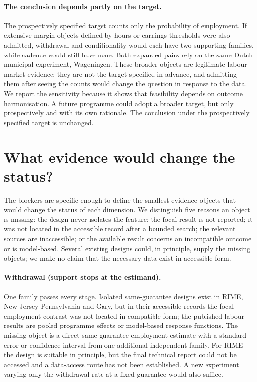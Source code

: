 \documentclass[11pt]{article}
\begin{document}
\paragraph{The conclusion depends partly on the target.} The prospectively specified target counts only the probability of employment. If extensive-margin objects defined by hours or earnings thresholds were also admitted, withdrawal and conditionality would each have two supporting families, while cadence would still have none. %
Both expanded pairs rely on the same Dutch municipal experiment, Wageningen. These broader objects are legitimate labour-market evidence; they are not the target specified in advance, and admitting them after seeing the counts would change the question in response to the data. We report the sensitivity because it shows that feasibility depends on outcome harmonisation. A future programme could adopt a broader target, but only prospectively and with its own rationale. The conclusion under the prospectively specified target is unchanged.

\section{What evidence would change the status?}

The blockers are specific enough to define the smallest evidence objects that would change the status of each dimension. We distinguish five reasons an object is missing: the design never isolates the feature; the focal result is not reported; it was not located in the accessible record after a bounded search; the relevant sources are inaccessible; or the available result concerns an incompatible outcome or is model-based. Several existing designs could, in principle, supply the missing objects; we make no claim that the necessary data exist in accessible form.

\paragraph{Withdrawal (support stops at the estimand).} One family passes every stage. Isolated same-guarantee designs exist in RIME, New Jersey-Pennsylvania and Gary, but in their accessible records the focal employment contrast was not located in compatible form; the published labour results are pooled programme effects or model-based response functions. The missing object is a direct same-guarantee employment estimate with a standard error or confidence interval from one additional independent family. For RIME the design is suitable in principle, but the final technical report could not be accessed and a data-access route has not been established. A new experiment varying only the withdrawal rate at a fixed guarantee would also suffice.
\end{document}
